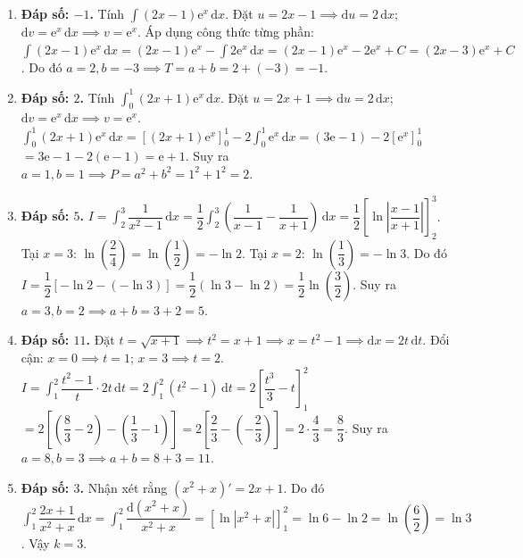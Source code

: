 \documentclass[12pt,a4paper]{article}
\begin{document}
\begin{enumerate}[start=16]
\item \textbf{Đáp số: $-1$.}  
Tính $\int (2x - 1)\mathrm{e}^x\,\mathrm{d}x$.  
Đặt $u = 2x - 1 \implies \mathrm{d}u = 2\,\mathrm{d}x$; $\mathrm{d}v = \mathrm{e}^x\,\mathrm{d}x \implies v = \mathrm{e}^x$.  
Áp dụng công thức từng phần:  
$\int (2x-1)\mathrm{e}^x\,\mathrm{d}x = (2x-1)\mathrm{e}^x - \int 2\mathrm{e}^x\,\mathrm{d}x = (2x-1)\mathrm{e}^x - 2\mathrm{e}^x + C = (2x - 3)\mathrm{e}^x + C$.  
Do đó $a = 2, b = -3 \implies T = a + b = 2 + (-3) = -1$.

\item \textbf{Đáp số: $2$.}  
Tính $\int_0^1 (2x+1)\mathrm{e}^x\,\mathrm{d}x$.  
Đặt $u = 2x+1 \implies \mathrm{d}u = 2\,\mathrm{d}x$; $\mathrm{d}v = \mathrm{e}^x\,\mathrm{d}x \implies v = \mathrm{e}^x$.  
$\int_0^1 (2x+1)\mathrm{e}^x\,\mathrm{d}x = [(2x+1)\mathrm{e}^x]_0^1 - 2\int_0^1 \mathrm{e}^x\,\mathrm{d}x = (3\mathrm{e} - 1) - 2[\mathrm{e}^x]_0^1$  
$= 3\mathrm{e} - 1 - 2(\mathrm{e} - 1) = \mathrm{e} + 1$.  
Suy ra $a = 1, b = 1 \implies P = a^2 + b^2 = 1^2 + 1^2 = 2$.

\item \textbf{Đáp số: $5$.}  
$I = \int_2^3 \dfrac{1}{x^2-1}\,\mathrm{d}x = \dfrac{1}{2}\int_2^3 \left(\dfrac{1}{x-1} - \dfrac{1}{x+1}\right)\,\mathrm{d}x = \dfrac{1}{2}\left[ \ln\left|\dfrac{x-1}{x+1}\right| \right]_2^3$.  
Tại $x = 3$: $\ln\left(\dfrac{2}{4}\right) = \ln\left(\dfrac{1}{2}\right) = -\ln 2$.  
Tại $x = 2$: $\ln\left(\dfrac{1}{3}\right) = -\ln 3$.  
Do đó $I = \dfrac{1}{2}\left[ -\ln 2 - (-\ln 3) \right] = \dfrac{1}{2}(\ln 3 - \ln 2) = \dfrac{1}{2}\ln\left(\dfrac{3}{2}\right)$.  
Suy ra $a = 3, b = 2 \implies a + b = 3 + 2 = 5$.

\item \textbf{Đáp số: $11$.}  
Đặt $t = \sqrt{x+1} \implies t^2 = x+1 \implies x = t^2 - 1 \implies \mathrm{d}x = 2t\,\mathrm{d}t$.  
Đổi cận: $x = 0 \implies t = 1$; $x = 3 \implies t = 2$.  
$I = \int_1^2 \dfrac{t^2-1}{t} \cdot 2t\,\mathrm{d}t = 2\int_1^2 (t^2 - 1)\,\mathrm{d}t = 2\left[ \dfrac{t^3}{3} - t \right]_1^2$  
$= 2\left[ \left(\dfrac{8}{3} - 2\right) - \left(\dfrac{1}{3} - 1\right) \right] = 2\left[ \dfrac{2}{3} - \left(-\dfrac{2}{3}\right) \right] = 2 \cdot \dfrac{4}{3} = \dfrac{8}{3}$.  
Suy ra $a = 8, b = 3 \implies a + b = 8 + 3 = 11$.

\item \textbf{Đáp số: $3$.}  
Nhận xét rằng $(x^2+x)' = 2x+1$.  
Do đó $\int_1^2 \dfrac{2x+1}{x^2+x}\,\mathrm{d}x = \int_1^2 \dfrac{\mathrm{d}(x^2+x)}{x^2+x} = \left[ \ln|x^2+x| \right]_1^2 = \ln 6 - \ln 2 = \ln\left(\dfrac{6}{2}\right) = \ln 3$.  
Vậy $k = 3$.


\end{enumerate}
\end{document}
